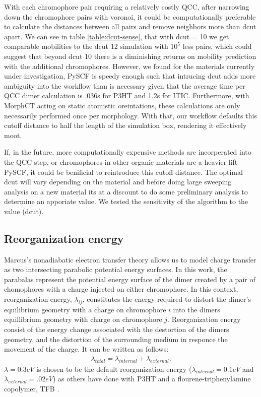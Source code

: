With each chromophore pair requiring a relatively costly QCC, after narrowing down the chromophore pairs with voronoi, it
could be
computationally preferable to calculate the distances between all pairs and remove neighbors more than dcut
apart. We can see in table \ref{table:dcut-sense}, that with dcut = 10 we get comparable mobilities to the
dcut 12 simulation with $10^5$ less
pairs, which could suggest that beyond dcut 10 there is a diminishing returns on mobility prediction with the
additional chromophores. However, we found for the materials currently under investigation, PySCF is speedy enough such that intrucing dcut adds more ambiguity
into the workflow than is necessary given that the average time per QCC dimer calculation is .036s for P3HT and
1.2s for ITIC. Furthermore, with MorphCT acting on static atomistic oreintations, these calculations 
are only necessarily performed once per morphology. With that, our workflow defaults this cutoff distance to half
the length of the simulation box, rendering it effectively moot. 

If, in the future, more computationally expensive methods are incorperated into the QCC step, or chromophores in other
organic materials are a heavier lift PySCF, it could be benificial to reintroduce this cutoff distance. The optimal dcut will vary depending on the material and before doing large sweeping analysis on a new
material its at a discount to do some preliminary analysis to determine an apporiate value. We tested the
sensitivity of the algorithm to the value (dcut). 

\subsection{Reorganization energy}

Marcus's nonadiabatic electron transfer theory allows us to model charge transfer as two
intersecting parabolic potential energy surfaces. In this work, the parabalas represent the potential energy surface
of the dimer created by a pair of chomophores with a charge injected on either chromophore. In this context, 
reorganization energy, $\lambda_{ij}$, constitutes the energy required to distort the dimer's equilibrium geometry with a
charge on chromophore $i$ into the dimers equillibrium geometry with charge on chromophore $j$.
Reorganization energy consist of the energy change associated with the destortion of the dimers geometry,
and the distortion of the surrounding medium in responce the movement of the charge. It can be written as
follows:
\begin{align}
    \lambda_{total} = \lambda_{internal} + \lambda_{external}.
\end{align} 
$\lambda = 0.3eV$ is chosen to be the default reorganization energy ($\lambda_{internal} = 0.1eV$
and $\lambda_{external} = .02eV$) as others have done with P3HT \cite{jones2017} and
a flourene-triphenylamine copolymer, TFB \cite{Gali2017}. 

